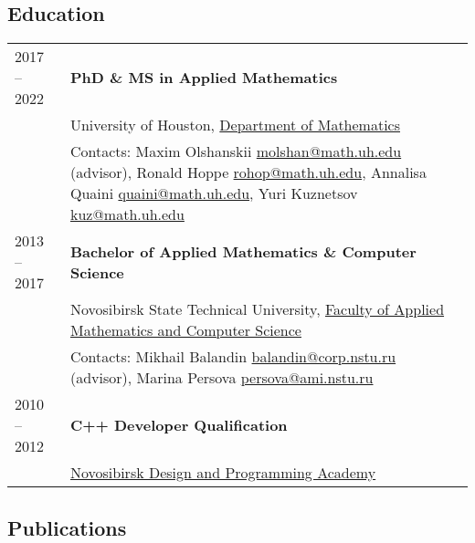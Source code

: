 \documentclass[a4paper,12pt]{article}
\begin{document}
	\subsection*{Education}

	\begin{longtable}{ l >{\raggedright\arraybackslash}p{15cm} }
		2017 -- 2022
			& \textbf{PhD \& MS in Applied Mathematics}\vspace{1mm}\\
			& University of Houston, \href{http://www.uh.edu/nsm/math/}{Department of Mathematics}\vspace{1mm}\\
			& Contacts: Maxim Olshanskii \href{mailto:molshan@math.uh.edu}{molshan@math.uh.edu} (advisor), Ronald Hoppe \href{m
				ailto:rohop@math.uh.edu}{rohop@math.uh.edu}, 
			Annalisa Quaini \href{mailto:quaini@math.uh.edu}{quaini@math.uh.edu}, Yuri Kuznetsov \href{mailto:kuz@math.uh.edu}{kuz@math.uh.edu}\vspace{3mm}\\
		2013 -- 2017
			& \textbf{Bachelor of Applied Mathematics \& Computer Science}\vspace{1mm}\\
			& Novosibirsk State Technical University, \href{https://en.nstu.ru/education/faculty-of-applied-mathematics-and-computer-science/}{Faculty of Applied Mathematics and Computer Science}\vspace{1mm}\\
			& Contacts: Mikhail Balandin \href{mailto:balandin@corp.nstu.ru}{balandin@corp.nstu.ru} (advisor), Marina Persova \href{mailto:persova@ami.nstu.ru}{persova@ami.nstu.ru}\vspace{3mm}\\
		2010 -- 2012
			& \textbf{C++ Developer Qualification}\vspace{1mm}\\
			& \href{http://www.nadip.ru/}{Novosibirsk Design and Programming Academy}\\
	\end{longtable}

	\subsection*{Publications}
	
\end{document}
